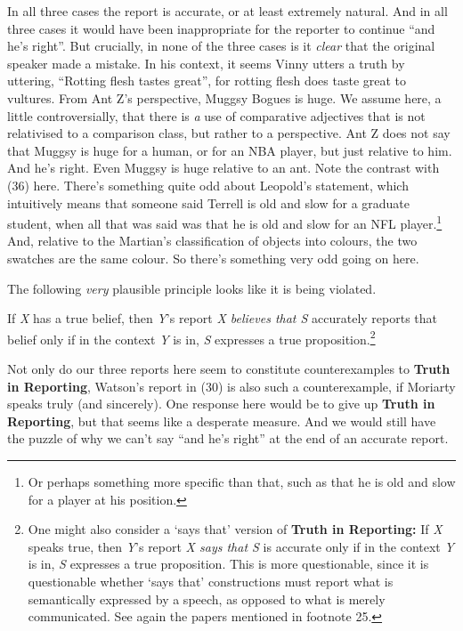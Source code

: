 \documentclass[
  11pt,
  letterpaper,
  DIV=11,
  numbers=noendperiod,
  twoside]{scrartcl}
\providecommand{\tightlist}{%
  \setlength{\itemsep}{0pt}\setlength{\parskip}{0pt}}
\begin{document}
In all three cases the report is accurate, or at least extremely
natural. And in all three cases it would have been inappropriate for the
reporter to continue ``and he's right''. But crucially, in none of the
three cases is it \emph{clear} that the original speaker made a mistake.
In his context, it seems Vinny utters a truth by uttering, ``Rotting
flesh tastes great'', for rotting flesh does taste great to vultures.
From Ant Z's perspective, Muggsy Bogues is huge. We assume here, a
little controversially, that there is \emph{a} use of comparative
adjectives that is not relativised to a comparison class, but rather to
a perspective. Ant Z does not say that Muggsy is huge for a human, or
for an NBA player, but just relative to him. And he's right. Even Muggsy
is huge relative to an ant. Note the contrast with (36) here. There's
something quite odd about Leopold's statement, which intuitively means
that someone said Terrell is old and slow for a graduate student, when
all that was said was that he is old and slow for an NFL
player.\footnote{Or perhaps something more specific than that, such as
  that he is old and slow for a player at his position.} And, relative
to the Martian's classification of objects into colours, the two
swatches are the same colour. So there's something very odd going on
here.

The following \emph{very} plausible principle looks like it is being
violated.

\begin{description}
\tightlist
\item[Truth in Reporting]
If \emph{X} has a true belief, then \emph{Y}'s report \emph{X believes
that S} accurately reports that belief only if in the context \emph{Y}
is in, \emph{S} expresses a true proposition.\footnote{One might also
  consider a `says that' version of \textbf{Truth in Reporting:} If
  \emph{X} speaks true, then \emph{Y}'s report \emph{X says that S} is
  accurate only if in the context \emph{Y} is in, \emph{S} expresses a
  true proposition. This is more questionable, since it is questionable
  whether `says that' constructions must report what is semantically
  expressed by a speech, as opposed to what is merely communicated. See
  again the papers mentioned in footnote 25.}
\end{description}

Not only do our three reports here seem to constitute counterexamples to
\textbf{Truth in Reporting}, Watson's report in (30) is also such a
counterexample, if Moriarty speaks truly (and sincerely). One response
here would be to give up \textbf{Truth in Reporting}, but that seems
like a desperate measure. And we would still have the puzzle of why we
can't say ``and he's right'' at the end of an accurate report.
\end{document}
